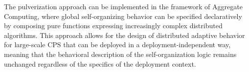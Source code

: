 The pulverization approach can be implemented in the framework of Aggregate Computing, where global self-organizing behavior can be specified declaratively by composing pure functions expressing increasingly complex distributed algorithms. This approach allows for the design of distributed adaptive behavior for large-scale CPS that can be deployed in a deployment-independent way, meaning that the behavioral description of the self-organization logic remains unchanged regardless of the specifics of the deployment context.

